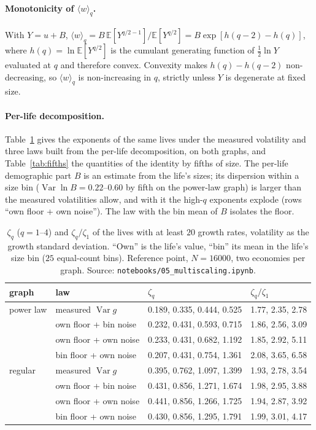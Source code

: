 \documentclass[pre,onecolumn,superscriptaddress,nofootinbib]{revtex4-2}
\newcommand{\E}{\mathbb E}
\newcommand{\Var}{\operatorname{Var}}
\begin{document}
\paragraph{Monotonicity of $\langle w\rangle_q$.}  With $Y=u+B$, $\langle w\rangle_q=B\,\E[Y^{q/2-1}]/\E[Y^{q/2}]=
B\exp[h(q-2)-h(q)]$, where $h(q)=\ln\E[Y^{q/2}]$ is the cumulant generating function of $\tfrac12\ln Y$
evaluated at $q$ and therefore convex.  Convexity makes $h(q)-h(q-2)$ non-decreasing, so $\langle w\rangle_q$ is
non-increasing in $q$, strictly unless $Y$ is degenerate at fixed size.

\paragraph{Per-life decomposition.}  Table~\ref{tab:mslaw} gives the exponents of the same lives under the
measured volatility and three laws built from the per-life decomposition, on both graphs, and
Table~\ref{tab:fifths} the quantities of the identity by fifths of size.  The per-life demographic part
$B$ is an estimate from the life's sizes; its dispersion within a size bin ($\Var\ln B=0.22$--$0.60$ by fifth on the
power-law graph) is larger than the measured volatilities allow, and with it the high-$q$ exponents
explode (rows ``own floor + own noise'').  The law with the bin mean of $B$ isolates the floor.

\begin{table}[h]
\caption{$\zeta_q$ ($q=1$--$4$) and $\zeta_q/\zeta_1$ of the lives with at least $20$ growth rates, volatility
as the growth standard deviation.  ``Own'' is the life's value, ``bin'' its mean in the life's size bin
($25$ equal-count bins).  Reference point, $N=16000$, two economies per graph.  Source:
\texttt{notebooks/05\_multiscaling.ipynb}.}
\label{tab:mslaw}
\begin{ruledtabular}
\begin{tabular}{llll}
graph & law & $\zeta_q$ & $\zeta_q/\zeta_1$\\
\hline
power law & measured $\Var g$ & 0.189, 0.335, 0.444, 0.525 & 1.77, 2.35, 2.78\\
 & own floor + bin noise & 0.232, 0.431, 0.593, 0.715 & 1.86, 2.56, 3.09\\
 & own floor + own noise & 0.233, 0.431, 0.682, 1.192 & 1.85, 2.92, 5.11\\
 & bin floor + own noise & 0.207, 0.431, 0.754, 1.361 & 2.08, 3.65, 6.58\\
regular & measured $\Var g$ & 0.395, 0.762, 1.097, 1.399 & 1.93, 2.78, 3.54\\
 & own floor + bin noise & 0.431, 0.856, 1.271, 1.674 & 1.98, 2.95, 3.88\\
 & own floor + own noise & 0.441, 0.856, 1.266, 1.725 & 1.94, 2.87, 3.92\\
 & bin floor + own noise & 0.430, 0.856, 1.295, 1.791 & 1.99, 3.01, 4.17\\
\end{tabular}
\end{ruledtabular}
\end{table}
\end{document}
